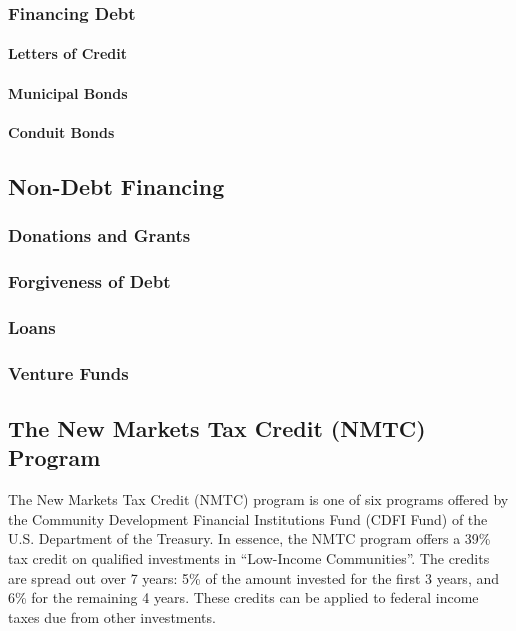 \subsubsection{Financing Debt}
\label{sec:financing_debt}\indent%

\paragraph{Letters of Credit}
\paragraph{Municipal Bonds}
\paragraph{Conduit Bonds}

\subsection{Non-Debt Financing}
\label{sec:non_debt_financing}\indent%

\subsubsection{Donations and Grants}
\label{sec:donations_grants}\indent%

\subsubsection{Forgiveness of Debt}
\label{sec:forgiveness_debt}\indent%

\subsubsection{Loans}
\label{sec:loans}\indent%

\subsubsection{Venture Funds}
\label{sec:venture_funds}\indent%

\subsection{The New Markets Tax Credit (NMTC) Program}
\label{sec:NMTC}\indent%

The New Markets Tax Credit (NMTC) program is one of six programs offered by the Community Development Financial Institutions Fund (CDFI Fund) of the U.S. Department of the Treasury. In essence, the NMTC program offers a 39\% tax credit on qualified investments in ``Low-Income Communities''. The credits are spread out over 7 years: 5\% of the amount invested for the first 3 years, and 6\% for the remaining 4 years. These credits can be applied to federal income taxes due from other investments. 

